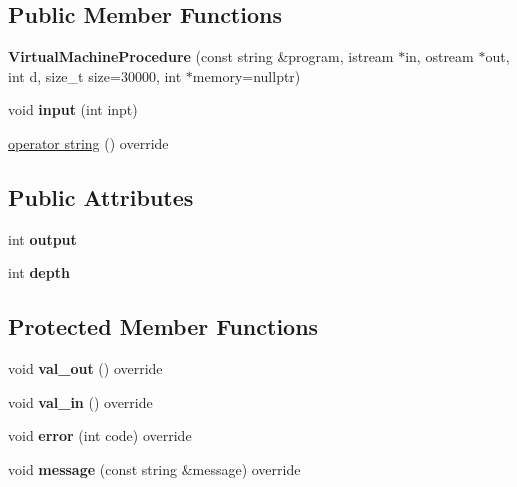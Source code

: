 \subsection*{Public Member Functions}
\begin{DoxyCompactItemize}
\item 
\mbox{\label{classVirtualMachineProcedure_ac7493ad6378b1c184c15fb1bcdd903ef}} 
{\bfseries Virtual\+Machine\+Procedure} (const string \&program, istream $\ast$in, ostream $\ast$out, int d, size\+\_\+t size=30000, int $\ast$memory=nullptr)
\item 
\mbox{\label{classVirtualMachineProcedure_a71d8552422569e57903212d51f38c6ee}} 
void {\bfseries input} (int inpt)
\item 
\hyperlink{classVirtualMachineProcedure_aea6310148a612586e5fd9e30650decb6}{operator string} () override
\end{DoxyCompactItemize}
\subsection*{Public Attributes}
\begin{DoxyCompactItemize}
\item 
\mbox{\label{classVirtualMachineProcedure_a0d82fcd19a990a5ad6d0bc51d25b5977}} 
int {\bfseries output}
\item 
\mbox{\label{classVirtualMachineProcedure_a95e6694d96087741291ca2ecf3009b97}} 
int {\bfseries depth}
\end{DoxyCompactItemize}
\subsection*{Protected Member Functions}
\begin{DoxyCompactItemize}
\item 
\mbox{\label{classVirtualMachineProcedure_aa6f5e4488e0b6a09da5d27fa2cf8e156}} 
void {\bfseries val\+\_\+out} () override
\item 
\mbox{\label{classVirtualMachineProcedure_a868e4133bc5fcfb969de2d3d6f6008fe}} 
void {\bfseries val\+\_\+in} () override
\item 
\mbox{\label{classVirtualMachineProcedure_a20aa263ac34a0e01d5a11cbfe919cb4f}} 
void {\bfseries error} (int code) override
\item 
\mbox{\label{classVirtualMachineProcedure_a755d40765bb540503a9bea5ffd091a46}} 
void {\bfseries message} (const string \&message) override
\end{DoxyCompactItemize}
